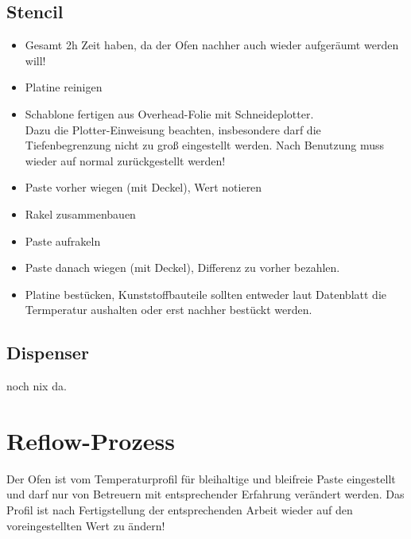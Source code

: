 \documentclass{\basedir/fablab-document}
\begin{document}
\subsection{Stencil}
\begin{itemize}
\item Gesamt 2h Zeit haben, da der Ofen nachher auch wieder aufgeräumt werden will!
\item Platine reinigen
\item Schablone fertigen aus Overhead-Folie mit Schneideplotter. \\ Dazu die Plotter-Einweisung beachten, insbesondere darf die Tiefenbegrenzung nicht zu groß eingestellt werden. Nach Benutzung muss wieder auf normal zurückgestellt werden!
\item Paste vorher wiegen (mit Deckel), Wert notieren
\item Rakel zusammenbauen
\item Paste aufrakeln
\item Paste danach wiegen (mit Deckel), Differenz zu vorher bezahlen.
\item Platine bestücken, Kunststoffbauteile sollten entweder laut Datenblatt die Termperatur aushalten oder erst nachher bestückt werden.
\end{itemize}

\subsection{Dispenser}
noch nix da. 


\section{Reflow-Prozess}
Der Ofen ist vom Temperaturprofil für bleihaltige und bleifreie Paste eingestellt und darf nur von Betreuern mit entsprechender Erfahrung verändert werden. Das Profil ist nach Fertigstellung der entsprechenden Arbeit wieder auf den voreingestellten Wert zu ändern!
\end{document}

